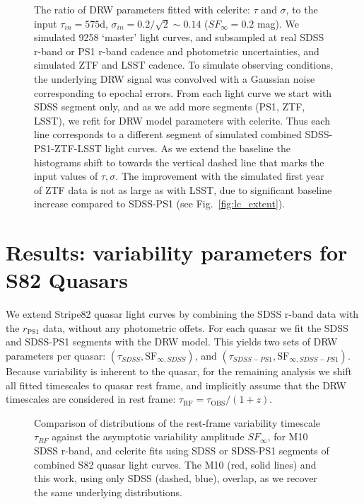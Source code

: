 \documentclass[twocolumn]{aastex62}
\newcommand{\project}[1]{\textsf{#1}}
\begin{document}
\begin{figure*}  %
\caption{The ratio of DRW parameters fitted with \project{celerite}: $\tau$ and $\sigma$, to the input $\tau_{in} = 575 $d, $\sigma_{in} = 0.2 / \sqrt{2} {\sim} 0.14$  ($SF_{\infty}=0.2$ mag). We simulated 9258 `master' light curves, and  subsampled at real SDSS r-band or PS1 r-band cadence and photometric uncertainties, and simulated ZTF and LSST cadence. To simulate observing conditions, the underlying DRW signal was convolved with a Gaussian noise corresponding to epochal errors. 
From each light curve we start with SDSS segment only, and as we add more segments (PS1, ZTF, LSST), we refit for DRW model parameters with \project{celerite}. Thus
each line corresponds to a different segment of simulated  combined SDSS-PS1-ZTF-LSST light curves. As we extend the baseline the histograms shift to towards the vertical dashed line that marks the input values of $\tau, \sigma$. The improvement with the simulated first year of ZTF data is not as large as with LSST, due to significant baseline increase compared to SDSS-PS1 (see Fig.~\ref{fig:lc_extent}).}
\label{fig:lc_simulated_results}
\end{figure*} 


%
%
%
%
%
%

\section{Results: variability parameters for S82 Quasars}\label{sec:results}

We extend Stripe82 quasar light curves by combining the SDSS r-band data with  the $r_{\mathrm{PS1}}$ data, without any photometric offets. For each quasar we fit the SDSS and SDSS-PS1 segments  with the DRW model. This yields two sets of DRW parameters per quasar: $(\tau_{SDSS}, \mathrm{SF}_{\infty, SDSS})$, and $(\tau_{SDSS-PS1}, \mathrm{SF}_{\infty, SDSS-PS1})$. Because variability is inherent to the quasar, for the remaining analysis we shift all fitted timescales to quasar rest frame, and implicitly assume that the DRW timescales are considered in rest frame: $\tau_{\mathrm{RF}} = \tau_{\mathrm{OBS}} / (1+z)$.


\begin{figure} %
\caption{Comparison of distributions of the rest-frame variability timescale $\tau_{RF}$ against the  asymptotic variability amplitude $SF_{\infty}$, for M10 SDSS r-band,  and \project{celerite} fits using  SDSS or SDSS-PS1 segments of combined S82 quasar light curves. The M10 (red, solid lines) and this work, using only SDSS (dashed, blue), overlap, as we recover the same underlying distributions. }
\label{fig:tau_sf_dist}
\end{figure} 
\end{document}
